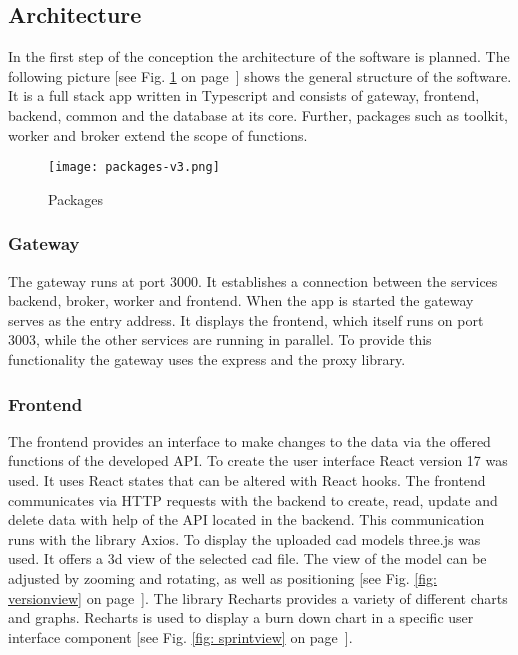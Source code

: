     \subsection*{Architecture}
    In the first step of the conception the architecture of the software is planned. The following picture [see Fig. \ref{fig: packages} on page~\pageref{fig: packages}] shows the general structure of the software. It is a full stack app written in Typescript and consists of gateway, frontend, backend, common and the database at its core. Further, packages such as toolkit, worker and broker extend the scope of functions.
    
    \begin{figure}[h]
        \centering
        \texttt{[image: packages-v3.png]}
        \caption{Packages}
        \label{fig: packages}
    \end{figure}

    \subsubsection*{Gateway}
    The gateway runs at port 3000. It establishes a connection between the services backend, broker, worker and frontend. When the app is started the gateway serves as the entry address. It displays the frontend, which itself runs on port 3003, while the other services are running in parallel. To provide this functionality the gateway uses the express and the proxy library.  
  
    \subsubsection*{Frontend}
    The frontend provides an interface to make changes to the data via the offered functions of the developed API. To create the user interface React version 17 was used. It uses React states that can be altered with React hooks. The frontend communicates via HTTP requests with the backend to create, read, update and delete data with help of the API located in the backend. This communication runs with the library Axios. To display the uploaded cad models three.js was used. It offers a 3d view of the selected cad file. The view of the model can be adjusted by zooming and rotating, as well as positioning [see Fig. \ref{fig: versionview} on page~\pageref{fig: versionview}]. The library Recharts provides a variety of different charts and graphs. Recharts is used to display a burn down chart in a specific user interface component [see Fig. \ref{fig: sprintview} on page~\pageref{fig: sprintview}].

